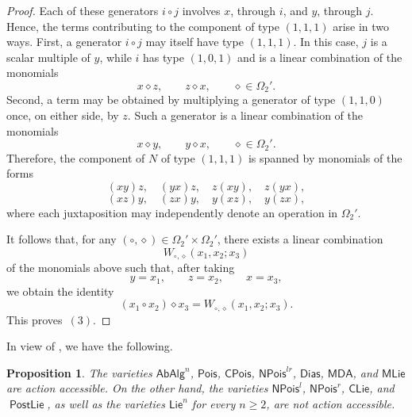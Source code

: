 \documentclass[reqno,a4paper]{amsart}
\theoremstyle{plain}
\newtheorem{proposition}[subsection]{Proposition}
\theoremstyle{definition}
\theoremstyle{remark}
\numberwithin{equation}{section}
\newcommand{\Lie}{\ensuremath{\mathsf{Lie}}}
\newcommand{\Pois}{\ensuremath{\mathsf{Pois}}}
\newcommand{\CPois}{\ensuremath{\mathsf{CPois}}}
\newcommand{\AbAlg}{\ensuremath{\mathsf{AbAlg}}}
\newcommand{\NP}{\ensuremath{\mathsf{NPois}}}
\newcommand{\Match}{\ensuremath{\mathsf{MDA}}}
\newcommand{\Dias}{\ensuremath{\mathsf{Dias}}}
\newcommand{\CLie}{\ensuremath{\mathsf{CLie}}}
\newcommand{\MatchLie}{\ensuremath{\mathsf{MLie}}}
\newcommand{\PostLie}{\operatorname{\mathsf{PostLie}}}
\begin{document}
\begin{proof}
Each of these generators $i\mathbin{\circ}j$ involves $x$, through $i$, and $y$, through $j$. Hence, the terms contributing to the component of type $(1,1,1)$ arise in two ways. First, a generator $i\mathbin{\circ}j$ may itself have type $(1,1,1)$. In this case, $j$ is a scalar multiple of $y$, while $i$ has type $(1,0,1)$ and is a linear combination of the monomials
\[
x\mathbin{\diamond}z,
\qquad
z\mathbin{\diamond}x,
\qquad
\diamond\in\Omega_2'.
\]
Second, a term may be obtained by multiplying a generator of type $(1,1,0)$ once, on either side, by $z$. Such a generator is a linear combination of the monomials
\[
x\mathbin{\diamond}y,
\qquad
y\mathbin{\diamond}x,
\qquad
\diamond\in\Omega_2'.
\]
Therefore, the component of $N$ of type $(1,1,1)$ is spanned by monomials of the forms
\[
(xy)z,\quad
(yx)z,\quad
z(xy),\quad
z(yx),
\]
\[
(xz)y,\quad
(zx)y,\quad
y(xz),\quad
y(zx),
\]
where each juxtaposition may independently denote an
operation in $\Omega_2'$.

It follows that, for any $(\circ,\diamond)\in
\Omega_2' \times \Omega_2'$, there exists a linear combination
\[
W_{\circ,\diamond}(x_1,x_2;x_3)
\]
of the monomials above such that, after taking
\[
y=x_1,\qquad z=x_2,\qquad x=x_3,
\]
we obtain the identity
\[
(x_1\mathbin{\circ}x_2)\mathbin{\diamond}x_3
=
W_{\circ,\diamond}(x_1,x_2;x_3).
\]
This proves~$(3)$.
\end{proof}

In view of , we have the following.

\begin{proposition}\label{PropExamplesNOperations}
The varieties $\AbAlg^n$, $\Pois$, $\CPois$, $\NP^{lr}$, $\Dias$, $\Match$, and $\MatchLie$ are action accessible. On the other hand, the varieties $\NP^{l}$, $\NP^{r}$, $\CLie$, and $\PostLie$, as well as the varieties $\Lie^n$ for every $n\geq2$, are not action accessible.
\end{proposition}
\end{document}
